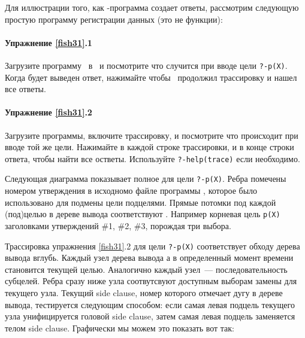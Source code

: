 \label{fish31}

Для иллюстрации того, как \prolog-программа создает ответы, рассмотрим следующую
простую программу регистрации данных (это не функции):


\paragraph{Упражнение \ref{fish31}.1} Загрузите программу \ в \prolog\ и
посмотрите что случится при вводе цели \verb|?-p(X)|. Когда будет выведен ответ,
нажимайте \keys{;} чтобы \prolog\ продолжил трассировку и нашел все ответы.

\paragraph{Упражнение \ref{fish31}.2} Загрузите программы, включите
трассировку, и посмотрите что происходит при вводе той же цели.
Нажимайте  в каждой строке трассировки, и \keys{;} в
конце строки ответа, чтобы найти все остветы. Используйте \verb|?-help(trace)|
если необходимо.


Следующая диаграмма показывает полное  для
цели \verb|?-p(X)|. Ребра помечены номером утверждения в исходномо файле
программы , которое было использовано для подмены цели подцелями.
Прямые потомки под каждой (под)целью в дереве вывода соответствуют
. Например корневая цель \verb|p(X)|
 заголовками утверждений \#1, \#2, \#3,
порождая три выбора.


Трассировка упражнения \ref{fish31}.2 для цели \verb|?-p(X)| соответствует
обходу дерева вывода вглубь. Каждый узел дерева вывода \prolog а в определенный
момент времени становится текущей целью. Аналогично каждый узел\ ---
последовательность субцелей. Ребра сразу ниже узла соотвутсвуют доступным
выборам замены для текущего узла. Текущий side clause, номер которого отмечает
дугу в дереве вывода, тестируется следующим способом: если самая левая подцель
текущего узла
унифицируется головой side clause, затем
самая левая подцель заменяется телом side clause.
Графически мы можем это показать вот так:

